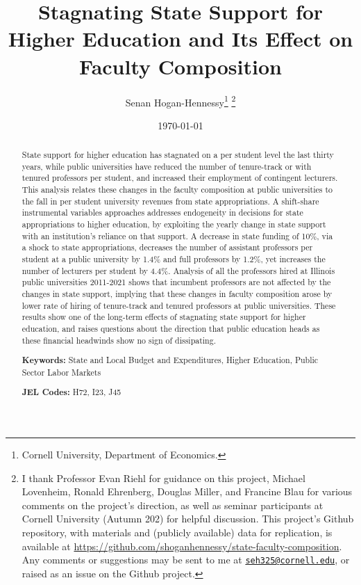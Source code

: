 \documentclass[notitlepage,12pt]{article}
\author{Senan Hogan-Hennessy\thanks{
    Cornell University, Department of Economics.}
    \thanks{I thank Professor Evan Riehl for guidance on this project, Michael Lovenheim, Ronald Ehrenberg, Douglas Miller, and Francine Blau for various comments on the project's direction,
    as well as seminar participants at Cornell University (Autumn 202) for helpful
    discussion.
    This project's Github repository, with materials and (publicly available) data for replication, is available at 
    \url{https://github.com/shoganhennessy/state-faculty-composition}.
    Any comments or suggestions may be sent to me at \href{mailto:seh325@cornell.edu}{\nolinkurl{seh325@cornell.edu}}, or raised as an issue on the Github project.}}
\title{Stagnating State Support for Higher Education and Its Effect on Faculty Composition}
\date{\today}
\begin{document}
\clearpage \maketitle
\thispagestyle{empty}
\begin{abstract}
\noindent
State support for higher education has stagnated on a per student level the last thirty years, while public universities have reduced the number of tenure-track or with tenured professors per student, and increased their employment of contingent lecturers.
This analysis relates these changes in the faculty composition at public universities to the fall in per student university revenues from state appropriations.
A shift-share instrumental variables approaches addresses endogeneity in decisions for state appropriations to higher education, by exploiting the yearly change in state support with an institution's reliance on that support.
A decrease in state funding of 10\%, via a shock to state appropriations, decreases the number of assistant professors per student at a public university by 1.4\% and full professors by 1.2\%, yet increases the number of lecturers per student by 4.4\%.
Analysis of all the professors hired at Illinois public universities 2011-2021 shows that incumbent professors are not affected by the changes in state support, implying that these changes in faculty composition arose by lower rate of hiring of tenure-track and tenured professors at public universities.
These results show one of the long-term effects of stagnating state support for higher education, and raises questions about the direction that public education heads as these financial headwinds show no sign of dissipating.

\vspace{0.75cm}
\noindent\textbf{Keywords:}
State and Local Budget and Expenditures,
Higher Education,
Public Sector Labor Markets

\vspace{0.5cm}
\noindent\textbf{JEL Codes:} H72, I23, J45
\end{abstract}
\newpage
\setcounter{page}{1}
\newpage
\doublespacing
\end{document}
